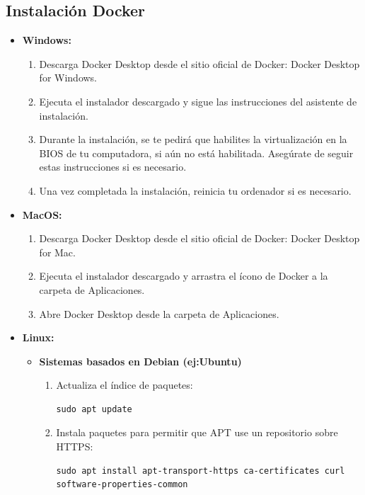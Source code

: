 \documentclass[paper=a4wide, fontsize=11pt]{report}	 %
\begin{document}
\subsection{Instalación Docker}
\begin{itemize}
    \item \textbf{Windows:} 
    \begin{enumerate}
        \item Descarga Docker Desktop desde el sitio oficial de Docker: Docker Desktop for Windows.
        \item Ejecuta el instalador descargado y sigue las instrucciones del asistente de instalación.
        \item Durante la instalación, se te pedirá que habilites la virtualización en la BIOS de tu computadora, si aún no está habilitada. Asegúrate de seguir estas instrucciones si es necesario.
        \item Una vez completada la instalación, reinicia tu ordenador si es necesario.
    \end{enumerate}
    \item \textbf{MacOS: }
    \begin{enumerate}
        \item Descarga Docker Desktop desde el sitio oficial de Docker: Docker Desktop for Mac.
        \item Ejecuta el instalador descargado y arrastra el ícono de Docker a la carpeta de Aplicaciones.
        \item Abre Docker Desktop desde la carpeta de Aplicaciones.
    \end{enumerate}
    \item \textbf{Linux:} 
    \begin{itemize}
        \item \textbf{Sistemas basados en Debian (ej:Ubuntu)}
        \begin{enumerate}
            \item Actualiza el índice de paquetes: 
            \begin{lstlisting}[frame=single, basicstyle=\small]
sudo apt update
            \end{lstlisting}
            \item Instala paquetes para permitir que APT use un repositorio sobre HTTPS:
            \begin{lstlisting}[frame=single, basicstyle=\small]
sudo apt install apt-transport-https ca-certificates curl
software-properties-common
            \end{lstlisting}
            

\end{enumerate}
\end{itemize}
\end{itemize}
\end{document}
